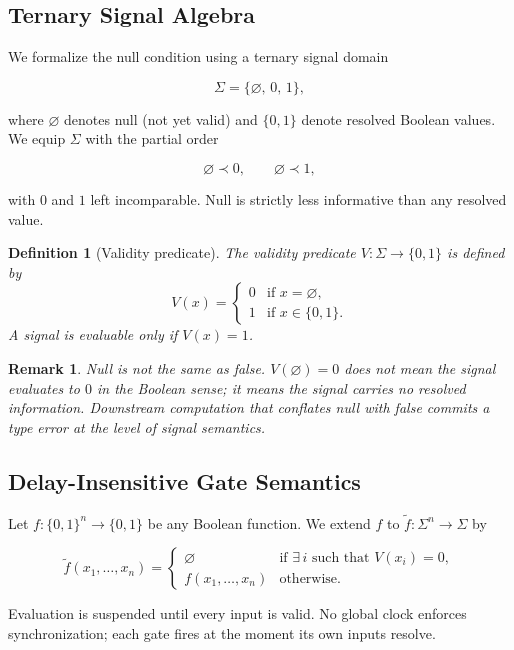 \documentclass[11pt]{article}
\newtheorem{definition}{Definition}
\newtheorem{remark}{Remark}
\theoremstyle{remark}
\begin{document}
\subsection{Ternary Signal Algebra}

We formalize the null condition using a ternary signal domain

\[
\Sigma = \{\varnothing,\, 0,\, 1\},
\]

where $\varnothing$ denotes null (not yet valid) and $\{0,1\}$ denote resolved Boolean values. We equip $\Sigma$ with the partial order

\[
\varnothing \prec 0, \qquad \varnothing \prec 1,
\]

with $0$ and $1$ left incomparable. Null is strictly less informative than any resolved value.

\begin{definition}[Validity predicate]
The validity predicate $V : \Sigma \to \{0,1\}$ is defined by
\[
V(x) = \begin{cases} 0 & \text{if } x = \varnothing, \\ 1 & \text{if } x \in \{0,1\}. \end{cases}
\]
A signal is evaluable only if $V(x) = 1$.
\end{definition}

\begin{remark}
Null is not the same as false. $V(\varnothing) = 0$ does not mean the signal evaluates to $0$ in the Boolean sense; it means the signal carries no resolved information. Downstream computation that conflates null with false commits a type error at the level of signal semantics.
\end{remark}

\subsection{Delay-Insensitive Gate Semantics}

Let $f : \{0,1\}^n \to \{0,1\}$ be any Boolean function. We extend $f$ to $\tilde{f} : \Sigma^n \to \Sigma$ by

\[
\tilde{f}(x_1, \dots, x_n) = \begin{cases} \varnothing & \text{if } \exists\, i \text{ such that } V(x_i) = 0, \\ f(x_1, \dots, x_n) & \text{otherwise.} \end{cases}
\]

Evaluation is suspended until every input is valid. No global clock enforces synchronization; each gate fires at the moment its own inputs resolve.
\end{document}
